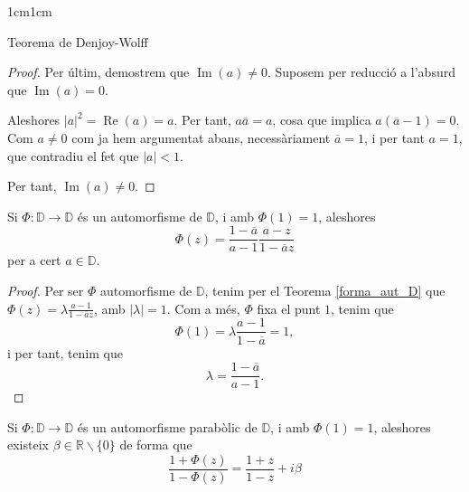 \begin{adjustwidth}{1cm}{1cm}
\begin{subsection}{Teorema de Denjoy-Wolff}
\begin{proof}
        Per últim, demostrem que $\operatorname{Im}(a)\neq 0$. Suposem per reducció a l'absurd que $\operatorname{Im}(a)=0$.

        Aleshores $|a|^2=\operatorname{Re}(a)=a$. Per tant, $a\overline{a}=a$, cosa que implica $a(\overline{a}-1)=0$. Com $a\neq 0$ com ja hem argumentat abans, necessàriament $\overline{a}=1$, i per tant $a=1$, que contradiu el fet que $|a|<1$. 

        Per tant, $\operatorname{Im}(a)\neq 0$.

    \end{proof}

    \begin{lema}
        Si $\Phi:\mathbb{D}\to \mathbb{D}$ és un automorfisme de $\mathbb{D}$, i amb $\Phi(1)=1$, aleshores 
        \[
            \Phi(z)=\frac{1-\overline{a}}{a-1}\frac{a-z}{1-\overline{a}z}
        \]
        per a cert $a\in \mathbb{D}$.
        \label{lema_forma_phi_dw}
    \end{lema}

    \begin{proof}
        Per ser $\Phi$ automorfisme de $\mathbb{D}$, tenim per el Teorema \ref{forma_aut_D} que $\Phi(z)=\lambda \frac{a-1}{1-\overline{a}z}$, amb $|\lambda|=1$. Com a més, $\Phi$ fixa el punt $1$, tenim que 
        \[
            \Phi(1)=\lambda \frac{a-1}{1-\overline{a}}=1,
        \]
        i per tant, tenim que 
        \[
            \lambda=\frac{1-\overline{a}}{a-1}.
        \]
    \end{proof}

    \begin{lema}
        Si $\Phi:\mathbb{D}\to \mathbb{D}$ és un automorfisme parabòlic de $\mathbb{D}$, i amb $\Phi(1)=1$, aleshores existeix $\beta\in \mathbb{R}\backslash\{0\}$ de forma que 
        \[
            \frac{1+\Phi(z)}{1-\Phi(z)}=\frac{1+z}{1-z}+i\beta
        \]
        \label{lema_parab_dw}
    \end{lema}


\end{subsection}
\end{adjustwidth}
